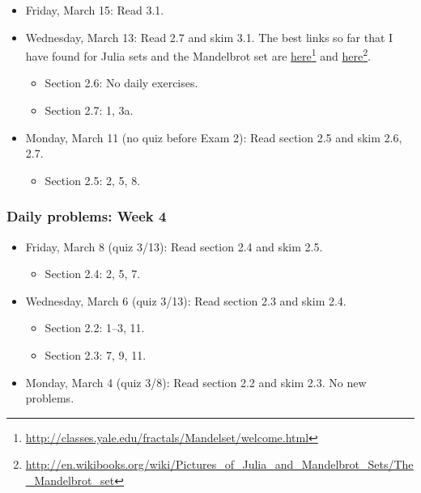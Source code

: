 \begin{itemize}
\item Friday, March 15: Read 3.1.

\item Wednesday, March 13: Read 2.7 and skim 3.1. The best links so far that I have found for Julia sets and the Mandelbrot set are \href{http://classes.yale.edu/fractals/Mandelset/welcome.html}{here}\footnote{\href{http://classes.yale.edu/fractals/Mandelset/welcome.html}{http:/\slash classes.yale.edu\slash fractals\slash Mandelset\slash welcome.html}} and \href{http://en.wikibooks.org/wiki/Pictures_of_Julia_and_Mandelbrot_Sets/The_Mandelbrot_set}{here}\footnote{\href{http://en.wikibooks.org/wiki/Pictures_of_Julia_and_Mandelbrot_Sets/The_Mandelbrot_set}{http:/\slash en.wikibooks.org\slash wiki\slash Pictures\_of\_Julia\_and\_Mandelbrot\_Sets\slash The\_Mandelbrot\_set}}.

\begin{itemize}
\item Section 2.6: No daily exercises.

\item Section 2.7: 1, 3a.

\end{itemize}

\item Monday, March 11 (no quiz before Exam 2): Read section 2.5 and skim 2.6, 2.7.

\begin{itemize}
\item Section 2.5: 2, 5, 8.

\end{itemize}

\end{itemize}

\subsubsection{Daily problems: Week 4}
\label{dailyproblems:week4}

\begin{itemize}
\item Friday, March 8 (quiz 3\slash 13): Read section 2.4 and skim 2.5.

\begin{itemize}
\item Section 2.4: 2, 5, 7.

\end{itemize}

\item Wednesday, March 6 (quiz 3\slash 13): Read section 2.3 and skim 2.4.

\begin{itemize}
\item Section 2.2: 1--3, 11.

\item Section 2.3: 7, 9, 11.

\end{itemize}

\item Monday, March 4 (quiz 3\slash 8): Read section 2.2 and skim 2.3. No new problems.

\end{itemize}

